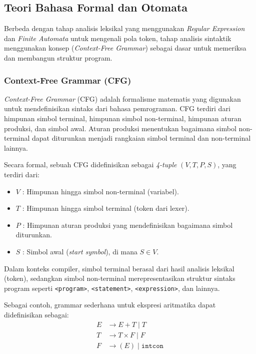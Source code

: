 \documentclass[12pt,a4paper]{article}
\begin{document}
\subsection{Teori Bahasa Formal dan Otomata}

Berbeda dengan tahap analisis leksikal yang menggunakan \textit{Regular
Expression} dan \textit{Finite Automata} untuk mengenali pola token, tahap
analisis sintaktik menggunakan konsep (\textit{Context-Free Grammar}) sebagai
dasar untuk memeriksa dan membangun struktur program.

\subsubsection{Context-Free Grammar (CFG)}

\textit{Context-Free Grammar} (CFG) adalah formalisme matematis yang digunakan
untuk mendefinisikan sintaks dari bahasa pemrograman. CFG terdiri dari himpunan
simbol terminal, himpunan simbol non-terminal, himpunan aturan produksi, dan
simbol awal. Aturan produksi menentukan bagaimana simbol non-terminal dapat
diturunkan menjadi rangkaian simbol terminal dan non-terminal lainnya.

Secara formal, sebuah CFG didefinisikan sebagai \textit{4-tuple} $(V, T, P, S)$,
yang terdiri dari:
\begin{itemize}
    \item $V$ : Himpunan hingga simbol non-terminal (variabel).
    \item $T$ : Himpunan hingga simbol terminal (token dari lexer).
    \item $P$ : Himpunan aturan produksi yang mendefinisikan bagaimana simbol
        diturunkan.
    \item $S$ : Simbol awal (\textit{start symbol}), di mana $S \in V$.
\end{itemize}

Dalam konteks compiler, simbol terminal berasal dari hasil analisis leksikal (token), sedangkan simbol non-terminal merepresentasikan struktur sintaks program seperti \texttt{<program>}, \texttt{<statement>}, \texttt{<expression>}, dan lainnya.

Sebagai contoh, grammar sederhana untuk ekspresi aritmatika dapat didefinisikan sebagai:
\begin{align*}
E &\rightarrow E + T \mid T \\
T &\rightarrow T \times F \mid F \\
F &\rightarrow (E) \mid \texttt{intcon}
\end{align*}
\end{document}
